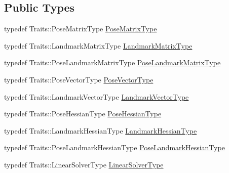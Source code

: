 \subsection*{Public Types}
\begin{DoxyCompactItemize}
\item 
typedef Traits\+::\+Pose\+Matrix\+Type \mbox{\hyperlink{classg2o_1_1_block_solver_a8c7c43d361bd31e3e0353889ba703bc0}{Pose\+Matrix\+Type}}
\item 
typedef Traits\+::\+Landmark\+Matrix\+Type \mbox{\hyperlink{classg2o_1_1_block_solver_afd898a666343291129d37a979e23ded6}{Landmark\+Matrix\+Type}}
\item 
typedef Traits\+::\+Pose\+Landmark\+Matrix\+Type \mbox{\hyperlink{classg2o_1_1_block_solver_a96bf60b923f816086cd2f24de38736ec}{Pose\+Landmark\+Matrix\+Type}}
\item 
typedef Traits\+::\+Pose\+Vector\+Type \mbox{\hyperlink{classg2o_1_1_block_solver_a65d51b9281e2e2597df05eb00801ee76}{Pose\+Vector\+Type}}
\item 
typedef Traits\+::\+Landmark\+Vector\+Type \mbox{\hyperlink{classg2o_1_1_block_solver_a19ade5e432f32e46557192ae75074304}{Landmark\+Vector\+Type}}
\item 
typedef Traits\+::\+Pose\+Hessian\+Type \mbox{\hyperlink{classg2o_1_1_block_solver_a0e7f862860a1e3391cec3cfaf69c48be}{Pose\+Hessian\+Type}}
\item 
typedef Traits\+::\+Landmark\+Hessian\+Type \mbox{\hyperlink{classg2o_1_1_block_solver_a465b1252905d90fd69b4243716620c45}{Landmark\+Hessian\+Type}}
\item 
typedef Traits\+::\+Pose\+Landmark\+Hessian\+Type \mbox{\hyperlink{classg2o_1_1_block_solver_aed8b44e394d2f19ca03c87adf90cc97c}{Pose\+Landmark\+Hessian\+Type}}
\item 
typedef Traits\+::\+Linear\+Solver\+Type \mbox{\hyperlink{classg2o_1_1_block_solver_a717fa8cb1dd5a212e41d8ebef67955e6}{Linear\+Solver\+Type}}
\end{DoxyCompactItemize}

